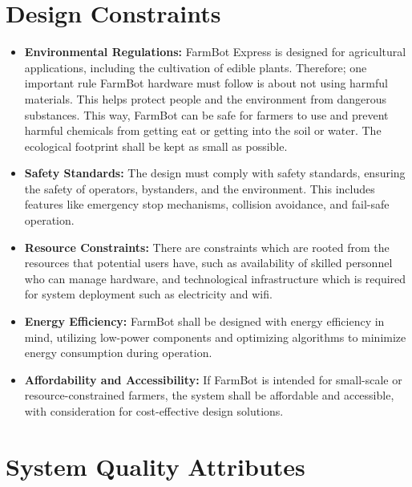 \section{Design Constraints}
\begin{itemize}
\item \textbf{Environmental Regulations:}  FarmBot Express is designed for agricultural applications, including the cultivation of edible plants. Therefore; one important rule FarmBot hardware must follow is about not using harmful materials. This helps protect people and the environment from dangerous substances. This way, FarmBot can be safe for farmers to use and prevent harmful chemicals from getting eat or getting into the soil or water. The ecological footprint shall be kept as small as possible.
\item \textbf{Safety Standards: }The design must comply with safety standards, ensuring the safety of operators, bystanders, and the environment. This includes features like emergency stop mechanisms, collision avoidance, and fail-safe operation.
\item \textbf{Resource Constraints:} There are constraints which are rooted from the resources that potential users have, such as availability of skilled personnel who can manage hardware, and technological infrastructure which is required for system deployment such as electricity and wifi.
\item \textbf{Energy Efficiency:} FarmBot shall be designed with energy efficiency in mind, utilizing low-power components and optimizing algorithms to minimize energy consumption during operation.
\item \textbf{Affordability and Accessibility:} If FarmBot is intended for small-scale or resource-constrained farmers, the system shall be affordable and accessible, with consideration for cost-effective design solutions.
\end{itemize}


\section{System Quality Attributes}

